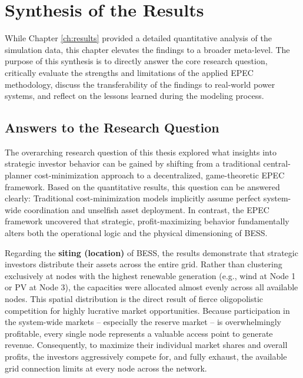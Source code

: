 \chapter{Synthesis of the Results} \label{ch:synthesis}

While Chapter \ref{ch:results} provided a detailed quantitative analysis of the simulation data, this chapter elevates the findings to a broader meta-level. The purpose of this synthesis is to directly answer the core research question, critically evaluate the strengths and limitations of the applied EPEC methodology, discuss the transferability of the findings to real-world power systems, and reflect on the lessons learned during the modeling process.

\section{Answers to the Research Question} \label{sec:answers_rq}

The overarching research question of this thesis explored what insights into strategic investor behavior can be gained by shifting from a traditional central-planner cost-minimization approach to a decentralized, game-theoretic EPEC framework. Based on the quantitative results, this question can be answered clearly: Traditional cost-minimization models implicitly assume perfect system-wide coordination and unselfish asset deployment. In contrast, the EPEC framework uncovered that strategic, profit-maximizing behavior fundamentally alters both the operational logic and the physical dimensioning of BESS.

Regarding the \textbf{siting (location)} of BESS, the results demonstrate that strategic investors distribute their assets across the entire grid. Rather than clustering exclusively at nodes with the highest renewable generation (e.g., wind at Node 1 or PV at Node 3), the capacities were allocated almost evenly across all available nodes. This spatial distribution is the direct result of fierce oligopolistic competition for highly lucrative market opportunities. Because participation in the system-wide markets -- especially the reserve market -- is overwhelmingly profitable, every single node represents a valuable access point to generate revenue. Consequently, to maximize their individual market shares and overall profits, the investors aggressively compete for, and fully exhaust, the available grid connection limits at every node across the network.



